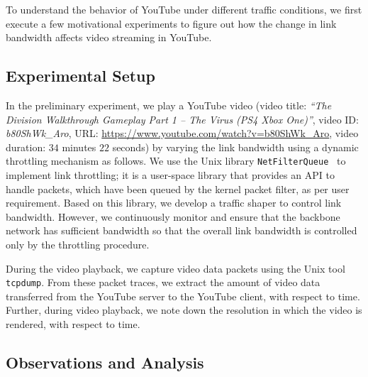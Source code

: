 
To understand the behavior of YouTube under different traffic conditions, we first execute a few motivational experiments to figure out how the change in link bandwidth affects video streaming in YouTube. 

\subsection{Experimental Setup}
In the preliminary experiment, we play a YouTube video (video title: {\em ``The Division Walkthrough Gameplay Part 1 -- The Virus (PS4 Xbox One)''}, video ID: {\em b80ShWk\_Aro}, URL: \url{https://www.youtube.com/watch?v=b80ShWk_Aro}, video duration: $34$ minutes $22$ seconds) by varying the link bandwidth using a dynamic throttling mechanism as follows. We use the Unix library \texttt{NetFilterQueue}~\cite{nfqueue} to implement link throttling; it is a user-space library that provides an API to handle packets, which have been queued by the kernel packet filter, as per user requirement. Based on this library, we develop a traffic shaper to control link bandwidth. However, we continuously monitor and ensure that the backbone network has sufficient bandwidth so that the overall link bandwidth is controlled only by the throttling procedure. 

During the video playback, we capture video data packets using the Unix tool \texttt{tcpdump}. From these packet traces, we extract the amount of video data transferred from the YouTube server to the YouTube client, with respect to time. Further, during video playback, we note down the resolution in which the video is rendered, with respect to time. 

\subsection{Observations and Analysis}

